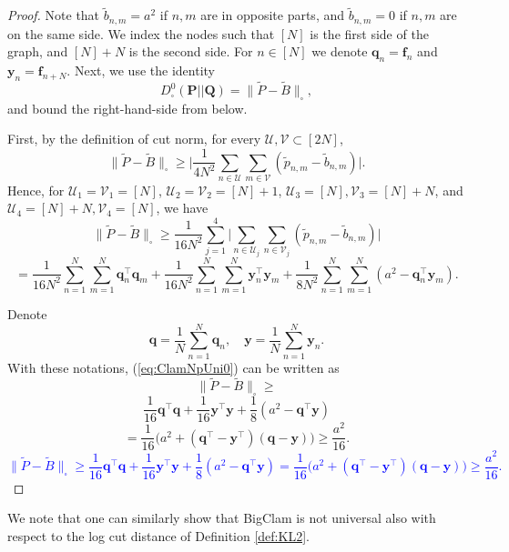 \documentclass{article}
\theoremstyle{plain}
\theoremstyle{definition}
\theoremstyle{remark}
\newcommand{\dan}[1]{{{\textcolor{blue}{ {#1}\textbf{}}}}}
\begin{document}
\begin{proof}
    
Note that $\tilde{b}_{n,m}=a^2$ if $n,m$ are in opposite parts, and $\tilde{b}_{n,m}=0$ if $n,m$ are on the same side.
We index the nodes such that $[N]$ is the first side of the graph, and $[N]+N$ is the second side. For $n\in[N]$ we denote $\mathbf{q}_n=\mathbf{f}_n$ and  $\mathbf{y}_n=\mathbf{f}_{n+N}$.
Next, we use the identity 
\[D^0_{\square}(\mathbf{P} || \mathbf{Q}) = \| \tilde{P}-\tilde{B}\|_{\square },\]
and bound the right-hand-side from below.

First, by the definition of cut norm, for every $\mathcal{U},\mathcal{V}\subset[2N]$,
\[\| \tilde{P}-\tilde{B}\|_{\square} \geq \Big|\frac{1}{4N^2}\sum_{n\in \mathcal{U}}\sum_{m\in \mathcal{V}} (\tilde{p}_{n,m} - \tilde{b}_{n,m})\Big|.\]
Hence, for $\mathcal{U}_1=\mathcal{V}_1=[N]$, $\mathcal{U}_2=\mathcal{V}_2=[N]+1$, $\mathcal{U}_3=[N],\mathcal{V}_3=[N]+N$, and $\mathcal{U}_4=[N]+N,\mathcal{V}_4=[N]$, we have
\[\| \tilde{P}-\tilde{B}\|_{\square} \geq \frac{1}{16N^2}\sum_{j=1}^4 \Big|\sum_{n\in \mathcal{U}_j}\sum_{n\in \mathcal{V}_j} (\tilde{p}_{n,m} - \tilde{b}_{n,m})\Big| \]
\begin{equation}
    \label{eq:ClamNpUni0}
= \frac{1}{16N^2}\sum_{n=1}^N\sum_{m=1}^{N} \mathbf{q}_n^\top \mathbf{q}_m  + \frac{1}{16N^2}\sum_{n=1}^N\sum_{m=1}^{N} \mathbf{y}_n^\top \mathbf{y}_m 
    +\frac{1}{8N^2}\sum_{n=1}^N\sum_{m=1}^{N} ( a^2 -\mathbf{q}_n^\top \mathbf{y}_m).
\end{equation}


Denote 
\[\mathbf{q}=\frac{1}{N}\sum_{n=1}^N \mathbf{q}_n, \quad \mathbf{y}=\frac{1}{N}\sum_{n=1}^N \mathbf{y}_n.\]
With these notations, (\ref{eq:ClamNpUni0}) can be written as
{\color{orange}
\[\| \tilde{P}-\tilde{B}\|_{\square} \geq \]
\[\frac{1}{16}\mathbf{q}^\top \mathbf{q}  + \frac{1}{16}\mathbf{y}^\top \mathbf{y} +\frac{1}{8}( a^2 -\mathbf{q}^\top \mathbf{y})\]
\[=\frac{1}{16}\Big(a^2 + (\mathbf{q}^\top-\mathbf{y}^\top)(\mathbf{q}-\mathbf{y})\Big) \geq \frac{a^2}{16}.\]
}
\dan{
\[\| \tilde{P}-\tilde{B}\|_{\square} \geq \frac{1}{16}\mathbf{q}^\top \mathbf{q}  + \frac{1}{16}\mathbf{y}^\top \mathbf{y} +\frac{1}{8}( a^2 -\mathbf{q}^\top \mathbf{y}) = \frac{1}{16}\Big(a^2 + (\mathbf{q}^\top-\mathbf{y}^\top)(\mathbf{q}-\mathbf{y})\Big) \geq \frac{a^2}{16}.\]
}
\end{proof}

We note that one can similarly show that BigClam is not universal also with respect to the log cut distance of Definition \ref{def:KL2}.
\end{document}
